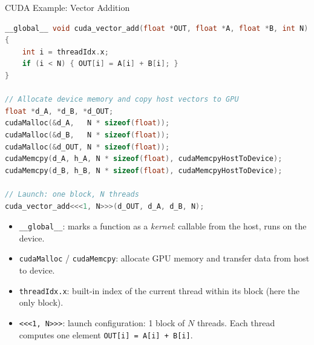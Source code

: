 \begin{frame}[fragile]{CUDA Example: Vector Addition}

\begin{lstlisting}[language=C++, keywordstyle=\color{fablue}\bfseries]
__global__ void cuda_vector_add(float *OUT, float *A, float *B, int N)
{
    int i = threadIdx.x;
    if (i < N) { OUT[i] = A[i] + B[i]; }
}

// Allocate device memory and copy host vectors to GPU
float *d_A, *d_B, *d_OUT;
cudaMalloc(&d_A,   N * sizeof(float));
cudaMalloc(&d_B,   N * sizeof(float));
cudaMalloc(&d_OUT, N * sizeof(float));
cudaMemcpy(d_A, h_A, N * sizeof(float), cudaMemcpyHostToDevice);
cudaMemcpy(d_B, h_B, N * sizeof(float), cudaMemcpyHostToDevice);

// Launch: one block, N threads
cuda_vector_add<<<1, N>>>(d_OUT, d_A, d_B, N);
\end{lstlisting}

  \vspace{0.2em}
  {\scriptsize
  \begin{itemize}
    \item \texttt{\_\_global\_\_}: marks a function as a \emph{kernel}: callable from the host, runs on the device.
    \item \texttt{cudaMalloc} / \texttt{cudaMemcpy}: allocate GPU memory and transfer data from host to device.
    \item \texttt{threadIdx.x}: built-in index of the current thread within its block (here the only block).
    \item \texttt{<{}<{}<1, N>{}>{}>}: launch configuration: 1 block of $N$ threads. Each thread computes one element \texttt{OUT[i] = A[i] + B[i]}.
  \end{itemize}
  }
\end{frame}

